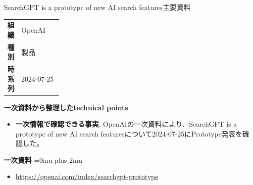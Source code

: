 \begin{technicalnote}{SearchGPT is a prototype of new AI search features}{主要資料}
\begingroup
\begin{tabularx}{\linewidth}{@{}>{\bfseries}p{0.22\linewidth}X@{}}
組織 & OpenAI \\
種別 & 製品 \\
時系列 & 2024-07-25 \\
\end{tabularx}
\smallskip
{\bfseries 一次資料から整理したtechnical points}
\begin{itemize}[leftmargin=1.5em,itemsep=0.35em]
\item \textbf{一次情報で確認できる事実}: OpenAIの一次資料により、SearchGPT is a prototype of new AI search featuresについて2024-07-25にPrototype発表を確認した。
\end{itemize}
\begin{minipage}{\linewidth}
\begin{samepage}
{\bfseries 一次資料}
\begingroup\sloppy
\Urlmuskip=0mu plus 2mu\relax
\begin{itemize}[leftmargin=1.5em,itemsep=0.25em]
\item {\scriptsize\url{https://openai.com/index/searchgpt-prototype}}
\end{itemize}
\endgroup
\end{samepage}
\end{minipage}
\endgroup
\end{technicalnote}
\medskip

